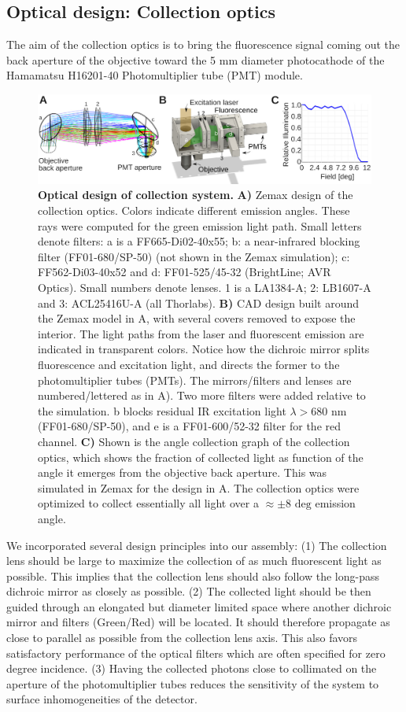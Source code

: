 \documentclass[10pt,letterpaper]{article}
\begin{document}
\subsection*{Optical design: Collection optics}
%
The aim of the collection optics is to bring the fluorescence signal coming out the back aperture of the objective toward the  5 mm diameter photocathode of the Hamamatsu H16201-40 Photomultiplier tube (PMT) module.
%
\begin{figure}[!t]
    \includegraphics[width=\textwidth]{fig3.jpg}
    \caption{{\bf Optical design of collection system.} \textbf{A)} Zemax design of the collection optics. Colors indicate different emission angles. These rays were computed for the green emission light path. Small letters denote filters: a is a FF665-Di02-40x55; b: a near-infrared blocking filter (FF01-680/SP-50) (not shown in the Zemax simulation); c: FF562-Di03-40x52 and d: FF01-525/45-32 (BrightLine; AVR Optics). Small numbers  denote lenses. 1 is a LA1384-A; 2: LB1607-A and 3: ACL25416U-A (all Thorlabs). \textbf{B)} CAD design built around the Zemax model in A, with several covers removed to expose the interior. The light paths from the laser and fluorescent emission are indicated in transparent colors. Notice how the dichroic mirror splits fluorescence and excitation light, and directs the former to the photomultiplier tubes (PMTs). The mirrors/filters and lenses are numbered/lettered as in A). Two more filters were added relative to the simulation. b blocks residual IR excitation light $\lambda>680\text{ nm}$ (FF01-680/SP-50), and e is a FF01-600/52-32 filter for the red channel. \textbf{C)} Shown is the angle collection graph of the collection optics, which shows the fraction of collected light as function of the angle it emerges from the objective back aperture. This was simulated in Zemax for the design in A. The collection optics were optimized to collect essentially all light over a $\approx\pm 8\text{ deg}$ emission angle.}
    \label{fig3}
\end{figure}
%
We incorporated several design principles into our assembly: (1) The collection lens should be large to maximize the collection of as much fluorescent light as possible. This implies that the collection lens should also follow the long-pass dichroic mirror as closely as possible. (2) The collected light should be then guided through an elongated but diameter limited space where another dichroic mirror and filters (Green/Red) will be located. It should therefore propagate as close to parallel as possible from the collection lens axis. This also favors satisfactory performance of the optical filters which are often specified for zero degree incidence. (3) Having the collected photons close to collimated on the aperture of the photomultiplier tubes reduces the sensitivity of the system to surface inhomogeneities of the detector\cite{Tsai2002, Tsai2015, Young2015}.\newline 
\end{document}
